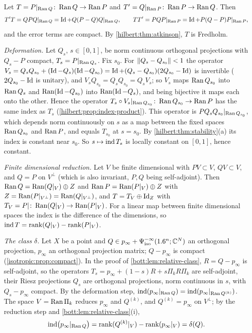 \subsection*{}
Let $T=P|_{\operatorname{Ran} Q}\colon\operatorname{Ran} Q\to\operatorname{Ran} P$ and $T'=Q|_{\operatorname{Ran} P}\colon\operatorname{Ran} P\to\operatorname{Ran} Q$. Then
\begin{equation*}
  T'T=QPQ|_{\operatorname{Ran} Q}=\operatorname{Id}+Q(P-Q)Q|_{\operatorname{Ran} Q},\qquad TT'=PQP|_{\operatorname{Ran} P}=\operatorname{Id}+P(Q-P)P|_{\operatorname{Ran} P},
\end{equation*}
and the error terms are compact. By \cref{hilbert:thm:atkinson}, $T$ is Fredholm.

\emph{Deformation.} Let $Q_s$, $s\in[0,1]$, be norm continuous orthogonal projections with
$Q_s-P$ compact, $T_s=P|_{\operatorname{Ran} Q_s}$. Fix $s_0$. For $\lVert Q_s-Q_{s_0}\rVert<1$ the operator
$V_s=Q_sQ_{s_0}+(\operatorname{Id}-Q_s)(\operatorname{Id}-Q_{s_0})=\operatorname{Id}+(Q_s-Q_{s_0})(2Q_{s_0}-\operatorname{Id})$ is invertible
($2Q_{s_0}-\operatorname{Id}$ is unitary), and $V_sQ_{s_0}=Q_sQ_{s_0}=Q_sV_s$; so $V_s$ maps $\operatorname{Ran} Q_{s_0}$
into $\operatorname{Ran} Q_s$ and $\operatorname{Ran}(\operatorname{Id}-Q_{s_0})$ into $\operatorname{Ran}(\operatorname{Id}-Q_s)$, and being bijective it maps each
onto the other. Hence the operator
$T_s\circ V_s|_{\operatorname{Ran} Q_{s_0}}\colon\operatorname{Ran} Q_{s_0}\to\operatorname{Ran} P$ has the same index
as $T_s$ (\cref{hilbert:prop:index-product}). This operator is
$PQ_sQ_{s_0}|_{\operatorname{Ran} Q_{s_0}}$, which
depends norm continuously on $s$ as a map between the fixed spaces $\operatorname{Ran} Q_{s_0}$ and $\operatorname{Ran} P$,
and equals $T_{s_0}$ at $s=s_0$. By \cref{hilbert:thm:stability}(a) its index is constant near
$s_0$. So $s\mapsto\operatorname{ind} T_s$ is locally constant on $[0,1]$, hence constant.

\emph{Finite dimensional reduction.} Let $V$ be finite dimensional with $PV\subset V$,
$QV\subset V$, and $Q=P$ on $V^\perp$ (which is also invariant, $P,Q$ being self-adjoint). Then
$\operatorname{Ran} Q=\operatorname{Ran}(Q|_V)\oplus Z$ and $\operatorname{Ran} P=\operatorname{Ran}(P|_V)\oplus Z$ with $Z=\operatorname{Ran}(P|_{V^\perp})=\operatorname{Ran}(Q|_{V^\perp})$,
and $T=T_V\oplus\operatorname{Id}_Z$ with $T_V=P|\colon\operatorname{Ran}(Q|_V)\to\operatorname{Ran}(P|_V)$. For a linear map between finite
dimensional spaces the index is the difference of the dimensions, so
$\operatorname{ind} T=\operatorname{rank}(Q|_V)-\operatorname{rank}(P|_V)$.

\emph{The class $\delta$.} Let $X$ be a point and $Q\in p_\infty+\Psi^{-\infty}_{\mathrm{iso}}(1.6^n;\mathbb{C}^N)$ an
orthogonal projection, $p_\infty$ an orthogonal projection matrix; $Q-p_\infty$ is compact
(\cref{isotropic:prop:compact}). In the proof of \cref{bott:lem:relative-class}, $R=Q-p_\infty$ is
self-adjoint, so the operators $T_s=p_\infty+(1-s)R+s\Pi_kR\Pi_k$ are self-adjoint, their Riesz
projections $Q_s$ are orthogonal projections, norm continuous in $s$, with $Q_s-p_\infty$ compact.
By the deformation step, $\operatorname{ind}(p_\infty|_{\operatorname{Ran} Q})=\operatorname{ind}(p_\infty|_{\operatorname{Ran} Q^{(k)}})$. The space
$V=\operatorname{Ran}\Pi_k$ reduces $p_\infty$ and $Q^{(k)}$, and $Q^{(k)}=p_\infty$ on $V^\perp$; by the
reduction step and \cref{bott:lem:relative-class}(i),
\begin{equation*}
  \operatorname{ind}\bigl(p_\infty|_{\operatorname{Ran} Q}\bigr)=\operatorname{rank}(Q^{(k)}|_V)-\operatorname{rank}(p_\infty|_V)=\delta(Q).
\end{equation*}

